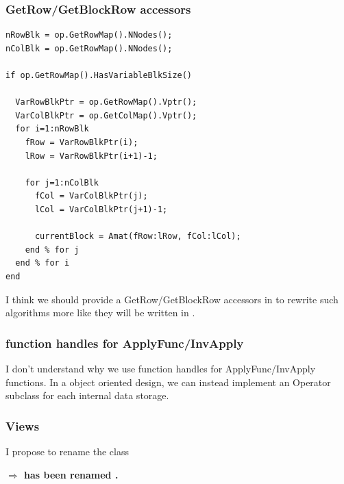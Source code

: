 \subsubsection{\muemat GetRow/GetBlockRow accessors}
\begin{verbatim}
nRowBlk = op.GetRowMap().NNodes();
nColBlk = op.GetRowMap().NNodes();

if op.GetRowMap().HasVariableBlkSize()

  VarRowBlkPtr = op.GetRowMap().Vptr();
  VarColBlkPtr = op.GetColMap().Vptr();
  for i=1:nRowBlk
    fRow = VarRowBlkPtr(i);
    lRow = VarRowBlkPtr(i+1)-1;
    
    for j=1:nColBlk
      fCol = VarColBlkPtr(j);
      lCol = VarColBlkPtr(j+1)-1;
      
      currentBlock = Amat(fRow:lRow, fCol:lCol);
    end % for j
  end % for i
end
\end{verbatim}
 
\begin{remark}
I think we should provide a GetRow/GetBlockRow accessors in \muemat \Operator to rewrite such algorithms more like they will be written in \mloo.
\end{remark}


\subsubsection{function handles for ApplyFunc/InvApply}

\begin{remark}
I don't understand why we use function handles for ApplyFunc/InvApply functions. In a object oriented design, we can instead implement an Operator subclass for each internal data storage.
\end{remark}

\subsubsection{Views}

\begin{remark}
I propose to rename the class \oldSingleViewOperator{}

\noindent \textbf{$\Rightarrow$ has been renamed \OperatorView.}
\end{remark}

